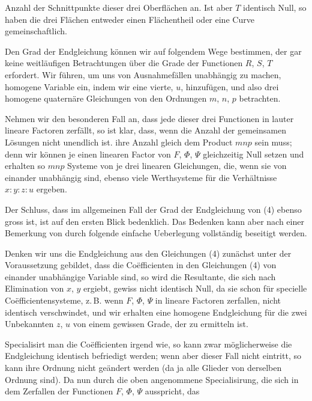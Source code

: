 

Anzahl der Schnittpunkte dieser drei Oberflächen an. Ist aber $T$
identisch Null, so haben die drei Flächen entweder einen Flächentheil
oder eine Curve gemeinschaftlich.

Den Grad der Endgleichung können wir auf folgendem Wege bestimmen,
der gar keine weitläufigen Betrachtungen über die Grade der
Functionen $R$, $S$, $T$ erfordert. Wir führen, um uns von
Ausnahmefällen unabhängig zu machen, homogene Variable ein, indem
wir eine vierte, $u$, hinzufügen, und also drei homogene quaternäre
Gleichungen
von den Ordnungen $m$, $n$, $p$ betrachten.

Nehmen wir den besonderen Fall an, dass jede dieser drei Functionen
in lauter lineare Factoren zerfällt, so ist klar, dass, wenn die
Anzahl der gemeinsamen Lösungen nicht unendlich ist. %
ihre Anzahl
gleich dem Product $mnp$ sein muss; denn wir können je einen
linearen Factor von $F$, $\Phi$, $\Psi$ gleichzeitig Null setzen und
erhalten so $mnp$ Systeme von je drei linearen Gleichungen, die,
wenn sie von einander unabhängig sind, ebenso viele Werthsysteme für
die Verhältnisse $x : y : z : u$ ergeben.

Der Schluss, dass im allgemeinen Fall der Grad der Endgleichung von
(4) ebenso gross ist, ist auf den ersten Blick bedenklich. Das
Bedenken kann aber nach einer Bemerkung von 
durch folgende einfache Ueberlegung vollständig beseitigt werden.

Denken wir uns die Endgleichung aus den Gleichungen (4) zunächst
unter der Voraussetzung gebildet, dass die Co\"efficienten in den
Gleichungen (4) von einander unabhängige Variable sind, so wird die
Resultante, die sich nach Elimination von $x$, $y$ ergiebt, gewiss
nicht identisch Null, da sie schon für specielle
Co\"efficientensysteme, z.\,B. wenn $F$, $\Phi$, $\Psi$ in lineare
Factoren zerfallen, nicht identisch verschwindet, und wir erhalten
eine homogene Endgleichung für die zwei Unbekannten $z$, $u$ von
einem gewissen Grade, der zu ermitteln ist.

Specialisirt man die Co\"efficienten irgend wie, so kann zwar
möglicherweise die Endgleichung identisch befriedigt werden; wenn
aber dieser Fall nicht eintritt, so kann ihre Ordnung nicht geändert
werden (da ja alle Glieder von derselben Ordnung sind). Da nun durch
die oben angenommene Specialisirung, die sich in dem Zerfallen der
Functionen $F$, $\Phi$, $\Psi$ ausspricht, das
